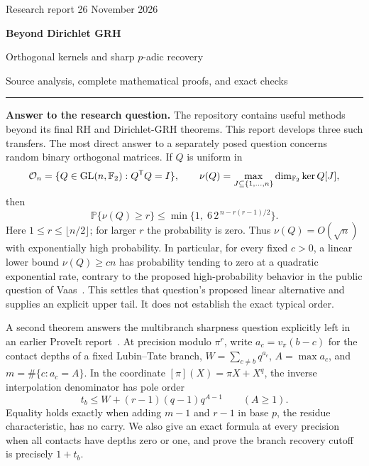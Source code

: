 \documentclass[11pt,letterpaper]{article}
\theoremstyle{definition}\newtheorem{definition}[theorem]{Definition}
\theoremstyle{remark}\newtheorem{remark}[theorem]{Remark}
\newcommand{\F}{\mathbb F}\newcommand{\Z}{\mathbb Z}\newcommand{\Q}{\mathbb Q}
\newcommand{\Prob}{\mathbb P}\newcommand{\E}{\mathbb E}
\begin{document}
\thispagestyle{plain}
{\large\sffamily\color{accent}Research report \hfill 26 November 2026}\par
\vspace{.7em}
{\fontsize{25}{29}\selectfont\bfseries\color{ink}Beyond Dirichlet GRH\par}
\vspace{.35em}
{\Large Orthogonal kernels and sharp $p$-adic recovery\par}
\vspace{.55em}
{\large Source analysis, complete mathematical proofs, and exact checks}\par
\vspace{.7em}\hrule\vspace{.7em}

\textbf{Answer to the research question.}
The repository contains useful methods beyond its final RH and Dirichlet-GRH theorems. This report develops three such transfers. The most direct answer to a separately posed question concerns random binary orthogonal matrices. If $Q$ is uniform in
\[
 \mathcal O_n=\{Q\in\GL(n,\F_2):Q^{\mathsf T}Q=I\},\qquad
 \nu(Q)=\max_{J\subseteq\{1,\ldots,n\}}\dim_{\F_2}\ker Q[J],
\]
then
\begin{equation}\label{eq:headline-binary}
 \boxed{\quad\Prob\{\nu(Q)\ge r\}\le
 \min\{1,\;6\,2^{\,n-r(r-1)/2}\}.\quad}
\end{equation}
Here $1\le r\le\lfloor n/2\rfloor$; for larger $r$ the probability is zero. Thus $\nu(Q)=O(\sqrt n)$ with exponentially high probability. In particular, for every fixed $c>0$, a linear lower bound $\nu(Q)\ge cn$ has probability tending to zero at a quadratic exponential rate, contrary to the proposed high-probability behavior in the public question of Vaas~\cite{vaas}. This settles that question's proposed linear alternative and supplies an explicit upper tail. It does not establish the exact typical order.

A second theorem answers the multibranch sharpness question explicitly left in an earlier ProveIt report~\cite{priorjets}. At precision modulo $\pi^r$, write $a_c=v_\pi(b-c)$ for the contact depths of a fixed Lubin--Tate branch, $W=\sum_{c\ne b}q^{a_c}$, $A=\max a_c$, and $m=\#\{c:a_c=A\}$. In the coordinate $[\pi](X)=\pi X+X^q$, the inverse interpolation denominator has pole order
\[
 t_b\le W+(r-1)(q-1)q^{A-1}\qquad(A\ge1).
\]
Equality holds exactly when adding $m-1$ and $r-1$ in base $p$, the residue characteristic, has no carry. We also give an exact formula at every precision when all contacts have depths zero or one, and prove the branch recovery cutoff is precisely $1+t_b$.
\end{document}
